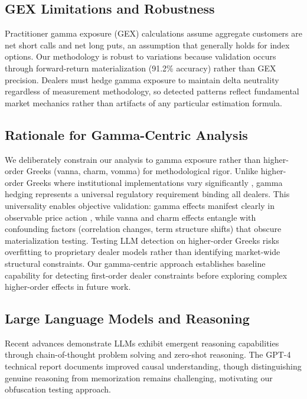 \subsection{GEX Limitations and Robustness}

Practitioner gamma exposure (GEX) calculations assume aggregate customers are net short calls and net long puts, an assumption that generally holds for index options. Our methodology is robust to variations because validation occurs through forward-return materialization (91.2\% accuracy) rather than GEX precision. Dealers must hedge gamma exposure to maintain delta neutrality regardless of measurement methodology, so detected patterns reflect fundamental market mechanics rather than artifacts of any particular estimation formula.

\subsection{Rationale for Gamma-Centric Analysis}
\label{sec:gamma-focus}

We deliberately constrain our analysis to gamma exposure rather than higher-order Greeks (vanna, charm, vomma) for methodological rigor. Unlike higher-order Greeks where institutional implementations vary significantly \cite{mixon2009}, gamma hedging represents a universal regulatory requirement binding all dealers. This universality enables objective validation: gamma effects manifest clearly in observable price action \cite{ni2022}, while vanna and charm effects entangle with confounding factors (correlation changes, term structure shifts) that obscure materialization testing. Testing LLM detection on higher-order Greeks risks overfitting to proprietary dealer models rather than identifying market-wide structural constraints. Our gamma-centric approach establishes baseline capability for detecting first-order dealer constraints before exploring complex higher-order effects in future work.

\subsection{Large Language Models and Reasoning}

Recent advances demonstrate LLMs exhibit emergent reasoning capabilities through chain-of-thought problem solving and zero-shot reasoning. The GPT-4 technical report \cite{openai2023gpt4} documents improved causal understanding, though distinguishing genuine reasoning from memorization remains challenging, motivating our obfuscation testing approach.

